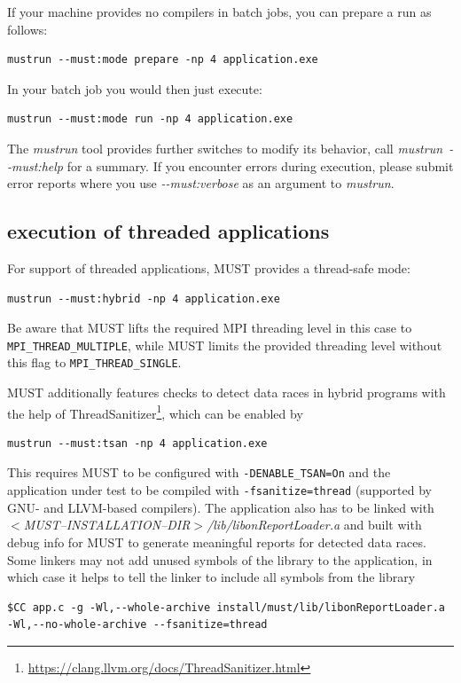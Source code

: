 \documentclass[english]{scrartcl}
\begin{document}
\noindent{}If your machine provides no compilers in batch jobs, you can prepare
a run as follows:
\begin{verbatim}
mustrun --must:mode prepare -np 4 application.exe
\end{verbatim}
In your batch job you would then just execute:
\begin{verbatim}
mustrun --must:mode run -np 4 application.exe
\end{verbatim}

\noindent{}The \emph{mustrun} tool provides further switches to modify its
behavior, call \mbox{\emph{mustrun \mbox{-{}-must:help}}} for a summary.  
If you
encounter errors during execution, please submit error reports where you use \emph{\mbox{-{}-must:verbose}} as
an argument to \emph{mustrun}.

\subsection{execution of threaded applications}
For support of threaded applications, MUST provides a thread-safe mode:
\begin{verbatim}
mustrun --must:hybrid -np 4 application.exe
\end{verbatim}
Be aware that MUST lifts the required MPI threading level in this case to
\texttt{MPI\_THREAD\_MULTIPLE}, while MUST limits the provided threading level without
this flag to \texttt{MPI\_THREAD\_SINGLE}.

MUST additionally features checks to detect data races in hybrid programs with the help of ThreadSanitizer\footnote{\url{https://clang.llvm.org/docs/ThreadSanitizer.html}}, which can be enabled by
\begin{verbatim}
mustrun --must:tsan -np 4 application.exe
\end{verbatim}
This requires MUST to be configured with \verb|-DENABLE_TSAN=On| and the application under test to be compiled with \verb|-fsanitize=thread| (supported by GNU- and LLVM-based compilers).
The application also has to be linked with \emph{$<$MUST\mbox{--}INSTALLATION\mbox{--}DIR$>$/lib/libonReportLoader.a} and built with debug info for MUST to generate meaningful reports for detected data races.
Some linkers may not add unused symbols of the library to the application, in which case it helps to tell the linker to include all symbols from the library
\begin{verbatim}
$CC app.c -g -Wl,--whole-archive install/must/lib/libonReportLoader.a -Wl,--no-whole-archive --fsanitize=thread
\end{verbatim}
\end{document}
